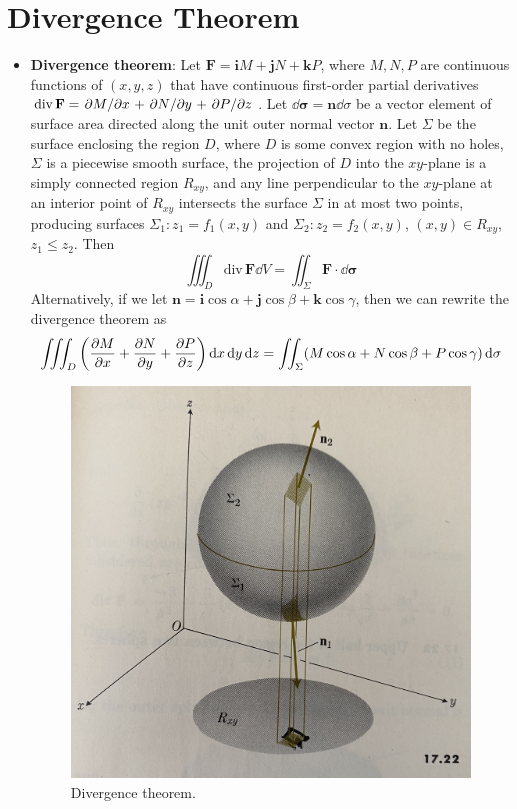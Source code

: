 \documentclass[../main.tex]{subfiles}
\begin{document}
\section{Divergence Theorem}
\begin{itemize}
    \item {}\textbf{Divergence theorem}: Let $\mathbf{F}=\mathbf{i}M+\mathbf{j}N+\mathbf{k}P$, where $M,N,P$ are continuous functions of $(x,y,z)$ that have continuous first-order partial derivatives $\text{div}\,\mathbf{F}=\pdv*{M}{x}+\pdv*{N}{y}+\pdv*{P}{z}$. Let $\dd{\bm{\sigma}}=\mathbf{n}\dd{\sigma}$ be a vector element of surface area directed along the unit outer normal vector $\mathbf{n}$. Let $\Sigma$ be the surface enclosing the region $D$, where $D$ is some convex region with no holes, $\Sigma$ is a piecewise smooth surface, the projection of $D$ into the $xy$-plane is a simply connected region $R_{xy}$, and any line perpendicular to the $xy$-plane at an interior point of $R_{xy}$ intersects the surface $\Sigma$ in at most two points, producing surfaces $\Sigma_1:z_1=f_1(x,y)$ and $\Sigma_2:z_2=f_2(x,y)$, $(x,y)\in R_{xy}$, $z_1\leq z_2$. Then
    \begin{equation*}
        \iiint_D\text{div}\,\mathbf{F}\dd{V} = \iint_\Sigma\mathbf{F}\cdot\dd{\bm{\sigma}}
    \end{equation*}
    Alternatively, if we let $\mathbf{n}=\mathbf{i}\cos\alpha+\mathbf{j}\cos\beta+\mathbf{k}\cos\gamma$, then we can rewrite the divergence theorem as
    \begin{equation*}
        \iiint_D\left( \pdv{M}{x}+\pdv{N}{y}+\pdv{P}{z} \right)\dd{x}\dd{y}\dd{z} = \iint_\Sigma(M\cos\alpha+N\cos\beta+P\cos\gamma)\dd{\sigma}
    \end{equation*}
    \begin{figure}[h!]
        \centering
        \includegraphics[width=0.4\linewidth]{ExtFiles/divergenceTheorem.jpg}
        \caption{Divergence theorem.}
        \label{fig:divergenceTheorem}
    \end{figure}

\end{itemize}
\end{document}
